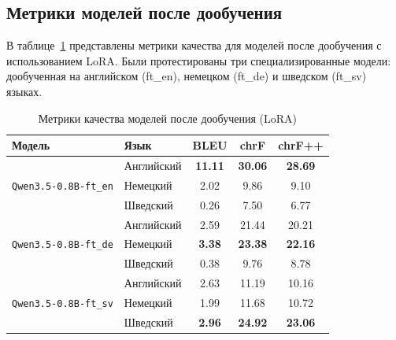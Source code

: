 \documentclass[14pt,a4paper]{extreport}
\begin{document}
\subsection{Метрики моделей после дообучения}

В таблице~\ref{tab:lora_metrics} представлены метрики качества для моделей после дообучения с использованием LoRA. Были протестированы три специализированные модели: дообученная на английском (ft\_en), немецком (ft\_de) и шведском (ft\_sv) языках.

\begin{table}[H]
\centering
\caption{Метрики качества моделей после дообучения (LoRA)}
\label{tab:lora_metrics}
\begin{tabular}{|l|l|c|c|c|}
\hline
\textbf{Модель} & \textbf{Язык} & \textbf{BLEU} & \textbf{chrF} & \textbf{chrF++} \\
\hline
\multirow{3}{*}{\texttt{Qwen3.5-0.8B-ft\_en}} & Английский & \textbf{11.11} & \textbf{30.06} & \textbf{28.69} \\
\cline{2-5}
& Немецкий & 2.02 & 9.86 & 9.10 \\
\cline{2-5}
& Шведский & 0.26 & 7.50 & 6.77 \\
\hline
\multirow{3}{*}{\texttt{Qwen3.5-0.8B-ft\_de}} & Английский & 2.59 & 21.44 & 20.21 \\
\cline{2-5}
& Немецкий & \textbf{3.38} & \textbf{23.38} & \textbf{22.16} \\
\cline{2-5}
& Шведский & 0.38 & 9.76 & 8.78 \\
\hline
\multirow{3}{*}{\texttt{Qwen3.5-0.8B-ft\_sv}} & Английский & 2.63 & 11.19 & 10.16 \\
\cline{2-5}
& Немецкий & 1.99 & 11.68 & 10.72 \\
\cline{2-5}
& Шведский & \textbf{2.96} & \textbf{24.92} & \textbf{23.06} \\
\hline
\end{tabular}
\end{table}
\end{document}
